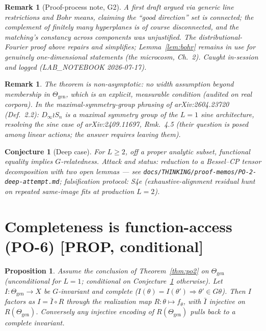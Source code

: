 \documentclass[11pt]{article}
\newtheorem{proposition}[theorem]{Proposition}
\newtheorem{conjecture}[theorem]{Conjecture}
\newtheorem{remark}[theorem]{Remark}
\newcommand{\Dinf}{D_\infty}
\begin{document}
\begin{remark}[Proof-process note, G2]
A first draft argued via generic line restrictions and Bohr means, claiming the ``good direction''
set is connected; the complement of finitely many hyperplanes is of course \emph{disconnected},
and the matching's constancy across components was unjustified. The distributional-Fourier proof
above repairs and simplifies; Lemma~\ref{lem:bohr} remains in use for genuinely one-dimensional
statements (the microcosm, Ch.~2). Caught in-session and logged (LAB\_NOTEBOOK 2026-07-17).
\end{remark}

\begin{remark}
The theorem is \emph{non-asymptotic}: no width assumption beyond membership in
$\Theta_{\mathrm{gen}}$, which is an explicit, measurable condition (audited on real corpora).
In the maximal-symmetry-group phrasing of arXiv:2604.23720 (Def.~2.2): $\Dinf\wr S_n$ is a
maximal symmetry group of the $L=1$ sine architecture, resolving the sine case of
arXiv:2409.11697, Rmk.~4.5 (their question is posed among linear actions; the answer requires
leaving them).
\end{remark}

\begin{conjecture}[Deep case]\label{conj:deep}
For $L\ge2$, off a proper analytic subset, functional equality implies $G$-relatedness.
\emph{Attack and status}: reduction to a Bessel--CP tensor decomposition with two open lemmas —
see \texttt{docs/THINKING/proof-memos/PO-2-deep-attempt.md}; falsification protocol: S4e
(exhaustive-alignment residual hunt on repeated same-image fits at production $L=2$).
\end{conjecture}

\section{Completeness is function-access (PO-6) [PROP, conditional]}

\begin{proposition}\label{prop:po6}
Assume the conclusion of Theorem~\ref{thm:po2} on $\Theta_{\mathrm{gen}}$ (unconditional for
$L=1$; conditional on Conjecture~\ref{conj:deep} otherwise). Let $I:\Theta_{\mathrm{gen}}\to X$ be
$G$-invariant and \emph{complete} ($I(\theta)=I(\theta')\Rightarrow\theta'\in G\theta$). Then $I$
factors as $I=\bar I\circ R$ through the realization map $R:\theta\mapsto f_\theta$, with
$\bar I$ injective on $R(\Theta_{\mathrm{gen}})$. Conversely any injective encoding of
$R(\Theta_{\mathrm{gen}})$ pulls back to a complete invariant.
\end{proposition}
\end{document}

